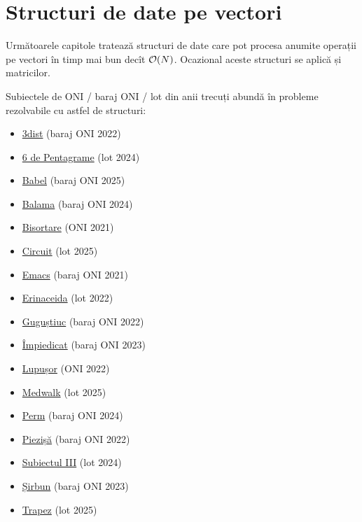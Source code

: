 \part{Structuri de date pe vectori}

Următoarele capitole tratează structuri de date care pot procesa anumite operații pe vectori în timp mai bun decît $\mathcal{O}(N)$. Ocazional aceste structuri se aplică și matricilor.

Subiectele de ONI / baraj ONI / lot din anii trecuți abundă în probleme rezolvabile cu astfel de structuri:

\begin{itemize}
  \item \href{https://kilonova.ro/problems/141}{3dist} (baraj ONI 2022)
  \item \href{https://kilonova.ro/problems/2801}{6 de Pentagrame} (lot 2024)
  \item \href{https://kilonova.ro/problems/3734}{Babel} (baraj ONI 2025)
  \item \href{https://kilonova.ro/problems/2666}{Balama} (baraj ONI 2024)
  \item \href{https://kilonova.ro/problems/63}{Bisortare} (ONI 2021)
  \item \href{https://kilonova.ro/problems/3806}{Circuit} (lot 2025)
  \item \href{https://kilonova.ro/problems/76}{Emacs} (baraj ONI 2021)
  \item \href{https://kilonova.ro/problems/210}{Erinaceida} (lot 2022)
  \item \href{https://kilonova.ro/problems/210}{Guguștiuc} (baraj ONI 2022)
  \item \href{https://kilonova.ro/problems/565}{Împiedicat} (baraj ONI 2023)
  \item \href{https://kilonova.ro/problems/137}{Lupușor} (ONI 2022)
  \item \href{https://kilonova.ro/problems/3790}{Medwalk} (lot 2025)
  \item \href{https://kilonova.ro/problems/2669}{Perm} (baraj ONI 2024)
  \item \href{https://kilonova.ro/problems/142}{Piezișă} (baraj ONI 2022)
  \item \href{https://kilonova.ro/problems/2843}{Subiectul III} (lot 2024)
  \item \href{https://kilonova.ro/problems/556}{Șirbun} (baraj ONI 2023)
  \item \href{https://kilonova.ro/problems/3790}{Trapez} (lot 2025)
\end{itemize}

